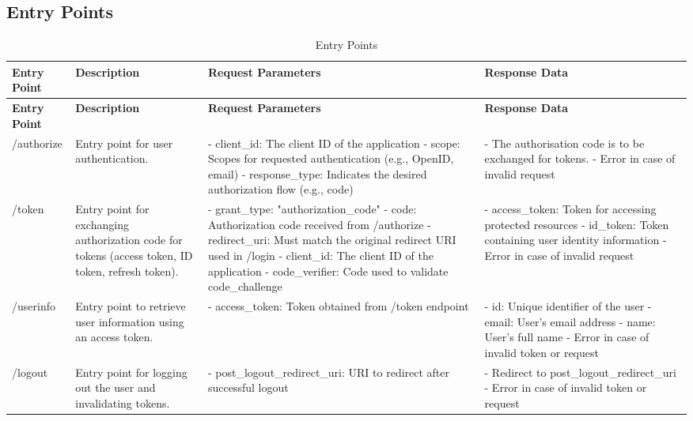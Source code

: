 \subsection{Entry Points}
\begin{longtable}{|p{3cm}|p{4cm}|p{4cm}|p{4cm}|}
\caption{Entry Points}
\label{table:threat_model_entry_points}
\hline
\rowcolor{grey!15}
\textbf{Entry Point} & \textbf{Description} & \textbf{Request Parameters} & \textbf{Response Data} \\
\hline
\endfirsthead
\hline
\rowcolor{grey!15}
\textbf{Entry Point} & \textbf{Description} & \textbf{Request Parameters} & \textbf{Response Data} \\
\hline
\endhead
\endfoot
\hline
\endlastfoot

/authorize & Entry point for user authentication.  & 
- client\_id: The client ID of the application \newline 
- scope: Scopes for requested authentication (e.g., OpenID, email) \newline 
- response\_type: Indicates the desired authorization flow (e.g., code) & 
- The authorisation code is to be exchanged for tokens. \newline 
- Error in case of invalid request \\
\hline

/token & Entry point for exchanging authorization code for tokens (access token, ID token, refresh token). & 
- grant\_type: "authorization\_code" \newline 
- code: Authorization code received from /authorize \newline
- redirect\_uri: Must match the original redirect URI used in /login \newline 
- client\_id: The client ID of the application
- code\_verifier: Code used to validate code\_challenge& 
- access\_token: Token for accessing protected resources \newline 
- id\_token: Token containing user identity information \newline 
- Error in case of invalid request \\
\hline

/userinfo & Entry point to retrieve user information using an access token. & 
- access\_token: Token obtained from /token endpoint & 
- id: Unique identifier of the user \newline 
- email: User's email address \newline 
- name: User's full name \newline 
- Error in case of invalid token or request \\
\hline

/logout & Entry point for logging out the user and invalidating tokens. & 
- post\_logout\_redirect\_uri: URI to redirect after successful logout & 
- Redirect to post\_logout\_redirect\_uri \newline 
- Error in case of invalid token or request \\
\hline

\end{longtable}

